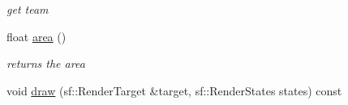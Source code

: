 \begin{DoxyCompactItemize}
\begin{DoxyCompactList}\small\item\em get team \end{DoxyCompactList}\item 
\mbox{\label{class_rocket_ad7c2bc69fc216ecb9320a77c044fff07}} 
float \hyperlink{class_rocket_ad7c2bc69fc216ecb9320a77c044fff07}{area} ()
\begin{DoxyCompactList}\small\item\em returns the area \end{DoxyCompactList}\item 
void \hyperlink{class_rocket_a4b83a058408ee42ea77248dd8f0d3339}{draw} (sf\+::\+Render\+Target \&target, sf\+::\+Render\+States states) const
\end{DoxyCompactItemize}
